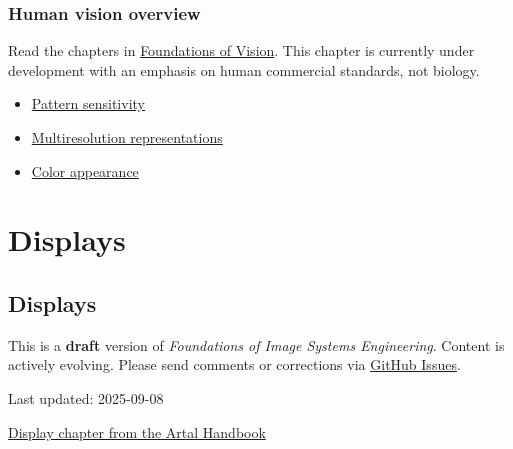\documentclass[
  letterpaper,
]{book}
\providecommand{\tightlist}{%
  \setlength{\itemsep}{0pt}\setlength{\parskip}{0pt}}\usepackage{longtable,booktabs,array}
\begin{document}
\section{Human vision overview}\label{sec-human-overview}

Read the chapters in
\href{https://foundationsofvision.stanford.edu}{Foundations of Vision}.
This chapter is currently under development with an emphasis on human
commercial standards, not biology.

\begin{itemize}
\tightlist
\item
  \href{https://wandell.github.io/FOV-1995/chapter-7-pattern-sensitivity.html}{Pattern
  sensitivity}
\item
  \href{https://wandell.github.io/FOV-1995/chapter-8-multiresolution-image-representations.html}{Multiresolution
  representations}
\item
  \href{https://wandell.github.io/FOV-1995/chapter-9-color.html}{Color
  appearance}
\end{itemize}

\part{Displays}

\chapter{Displays}\label{sec-displays}

\begin{tcolorbox}[enhanced jigsaw, colframe=quarto-callout-warning-color-frame, titlerule=0mm, rightrule=.15mm, opacitybacktitle=0.6, colback=white, leftrule=.75mm, coltitle=black, title=\textcolor{quarto-callout-warning-color}{\faExclamationTriangle}\hspace{0.5em}{Work in Progress}, bottomrule=.15mm, colbacktitle=quarto-callout-warning-color!10!white, breakable, left=2mm, bottomtitle=1mm, toptitle=1mm, opacityback=0, arc=.35mm, toprule=.15mm]

This is a \textbf{draft} version of \emph{Foundations of Image Systems
Engineering}. Content is actively evolving. Please send comments or
corrections via \href{https://github.com/wandell/FISE-git/issues}{GitHub
Issues}.

Last updated: 2025-09-08

\end{tcolorbox}

\href{resources/characterizing-artal.qmd}{Display chapter from the Artal
Handbook}
\end{document}

